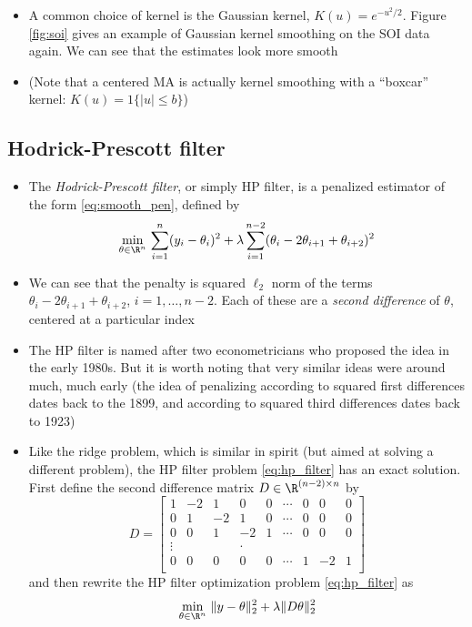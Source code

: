 \documentclass{article}
\begin{document}
\begin{itemize}
\item A common choice of kernel is the Gaussian kernel, $K(u) =
  e^{-u^2/2}$. Figure \ref{fig:soi} gives an example of Gaussian kernel
  smoothing on the SOI data again. We can see that the estimates look more
  smooth  

\item (Note that a centered MA is actually kernel smoothing with a ``boxcar''
  kernel: $K(u) = 1\{|u| \leq b\}$)     
\end{itemize}

\subsection{Hodrick-Prescott filter}

\begin{itemize}
\item The \emph{Hodrick-Prescott filter}, or simply HP filter, is a penalized 
  estimator of the form \eqref{eq:smooth_pen}, defined by 
  \begin{equation}
  \label{eq:hp_filter}
  \min_{\theta \in \R^n} \, \sum_{i=1}^n (y_i - \theta_i)^2 + \lambda
  \sum_{i=1}^{n-2} (\theta_i - 2\theta_{i+1} + \theta_{i+2})^2
  \end{equation}

\item We can see that the penalty is squared $\ell_2$ norm of the terms
  $\theta_i -  2\theta_{i+1} + \theta_{i+2}$, $i = 1,\dots,n-2$. Each of these
  are a \emph{second difference} of $\theta$, centered at a particular index 

\item The HP filter is named after two econometricians who proposed the idea in
  the early 1980s. But it is worth noting that very similar ideas were around
  much, much early (the idea of penalizing according to squared first
  differences dates back to the 1899, and according to squared third differences
  dates back to 1923)    

\item Like the ridge problem, which is similar in spirit (but aimed at solving a 
  different problem), the HP filter problem \eqref{eq:hp_filter} has an exact 
  solution. First define the second difference matrix $D \in \R^{(n-2) \times
    n}$ by 
  \begin{equation}
  \label{eq:d_mat}
  D = \begin{bmatrix}
  1 & -2 & 1 & 0 & 0 & \cdots & 0 & 0 & 0 \\
  0 & 1 & -2 & 1 & 0 & \cdots & 0 & 0 & 0 \\
  0 & 0 & 1 & -2 & 1 & \cdots & 0 & 0 & 0 \\
  \vdots & & & \cdot & & & \\
  0 & 0 & 0 & 0 & 0 & \cdots & 1 & -2 & 1 \\
  \end{bmatrix}
  \end{equation}
  and then rewrite the HP filter optimization problem \eqref{eq:hp_filter} as 
  \begin{equation}
  \label{eq:hp_filter2}
  \min_{\theta \in \R^n} \, \|y - \theta\|_2^2 + \lambda \|D \theta\|_2^2 
  \end{equation}


\end{itemize}
\end{document}
